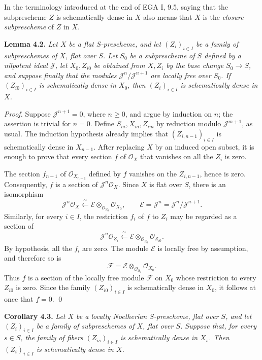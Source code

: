 In the terminology introduced at the end of EGA I, 9.5, saying that the
subprescheme \(Z\) is schematically dense in \(X\) also means that \(X\)
is the \emph{closure subprescheme} of \(Z\) in \(X\).

\medskip
\noindent{}\textbf{Lemma 4.2.}
\textit{Let \(X\) be a flat \(S\)-prescheme, and let
\((Z_i)_{i\in I}\) be a family of subpreschemes of \(X\), flat over
\(S\). Let \(S_0\) be a subprescheme of \(S\) defined by a nilpotent
ideal \(\mathscr J\), let \(X_0,Z_{i0}\) be obtained from \(X,Z_i\) by
the base change \(S_0\to S\), and suppose finally that the modules
\(\mathscr J^n/\mathscr J^{n+1}\) are locally free over \(S_0\).
If \((Z_{i0})_{i\in I}\) is schematically dense in
\(X_0\), then \((Z_i)_{i\in I}\) is schematically dense in \(X\).}

\emph{Proof.}
Suppose \(\mathscr J^{n+1}=0\), where \(n\geq0\), and argue by induction
on \(n\); the assertion is trivial for \(n=0\). Define
\(S_m,X_m,Z_{im}\) by reduction modulo \(\mathscr J^{m+1}\), as usual.
The induction hypothesis already implies that
\((Z_{i,n-1})_{i\in I}\) is schematically dense in \(X_{n-1}\).
After replacing \(X\) by an induced open subset, it is enough to prove
that every section \(f\) of \(\mathscr O_X\) that vanishes on all the
\(Z_i\) is zero.

The section \(f_{n-1}\) of \(\mathscr O_{X_{n-1}}\)
defined by \(f\) vanishes on the \(Z_{i,n-1}\), hence is zero.
Consequently, \(f\) is a section of
\(\mathscr J^n\mathscr O_X\). Since \(X\) is flat over \(S\), there is
an isomorphism
\[
  \mathscr J^n\mathscr O_X
  \xleftarrow{\ \sim\ }
  \mathscr E\otimes_{\mathscr O_{S_0}}\mathscr O_{X_0},
  \qquad
  \mathscr E=\mathscr J^n=\mathscr J^n/\mathscr J^{n+1}.
\]
Similarly, for every \(i\in I\), the restriction
\(f_i\) of \(f\) to \(Z_i\) may be regarded as a section of
\[
  \mathscr J^n\mathscr O_{Z_i}
  \xleftarrow{\ \sim\ }
  \mathscr E\otimes_{\mathscr O_{S_0}}\mathscr O_{Z_{i0}}.
\]
By hypothesis, all the \(f_i\) are zero. The module \(\mathscr E\) is
locally free by assumption, and therefore so is
\[
  \mathscr F
  =\mathscr E\otimes_{\mathscr O_{S_0}}\mathscr O_{X_0}.
\]
Thus \(f\) is a section of the locally free module \(\mathscr F\) on
\(X_0\) whose restriction to every \(Z_{i0}\) is zero. Since the family
\((Z_{i0})_{i\in I}\) is schematically dense in \(X_0\), it follows at
once that \(f=0\). \qed

\medskip
\noindent{}\textbf{Corollary 4.3.}
\textit{Let \(X\) be a locally Noetherian \(S\)-prescheme, flat over
\(S\), and let \((Z_i)_{i\in I}\) be a family of subpreschemes of \(X\),
flat over \(S\). Suppose that, for every \(s\in S\), the family of fibers
\((Z_{is})_{i\in I}\) is schematically dense in \(X_s\). Then
\((Z_i)_{i\in I}\) is schematically dense in \(X\).}

